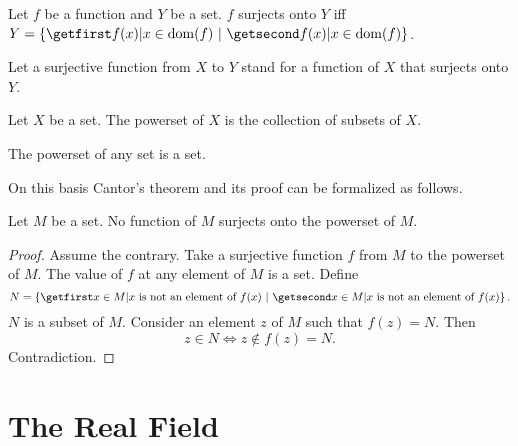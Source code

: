 \documentclass{article}
\begin{document}
    \begin{definition*}
      Let $f$ be a function and $Y$ be a set.
      $f$ surjects onto $Y$ iff $Y = \class{f(x) | x \in \dom(f)}$.
    \end{definition*}

    Let a surjective function from $X$ to $Y$ stand for a function of $X$ that
    surjects onto $Y$.

    \begin{definition*}
      Let $X$ be a set.
      The powerset of $X$ is the collection of subsets of $X$.
    \end{definition*}

    \begin{axiom*}
      The powerset of any set is a set.
    \end{axiom*}

  On this basis Cantor's theorem and its proof can be formalized as follows.

    \begin{theorem*}[Cantor]
      Let $M$ be a set.
      No function of $M$ surjects onto the powerset of $M$.
    \end{theorem*}
    \begin{proof}
      Assume the contrary.
      Take a surjective function $f$ from $M$ to the powerset of $M$.
      The value of $f$ at any element of $M$ is a set.
      Define \[ N = \class{x \in M | \text{$x$ is not an element of $f(x)$}}. \]
      $N$ is a subset of $M$.
      Consider an element $z$ of $M$ such that $f(z) = N$.
      Then \[ z \in N \iff z \notin f(z) = N. \]
      Contradiction.
    \end{proof}


\section{The Real Field}
\end{document}

